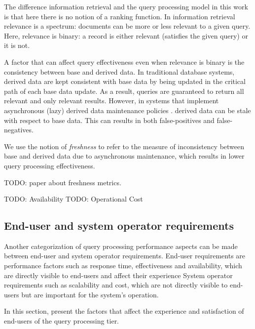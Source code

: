 The difference information retrieval and the query processing model in this work is that here there is no notion of a
ranking function.
In information retrieval relevance is a spectrum: documents can be more or less relevant to a given query.
Here, relevance is binary: a record is either relevant (satisfies the given query) or it is not.


A factor that can affect query effectiveness even when relevance is binary is the consistency between base
and derived data.
In traditional database systems, derived data are kept consistent with base data by being updated in the critical path
of each base data update.
As a result, queries are guaranteed to return all relevant and only relevant results.
However, in systems that implement asynchronous (lazy) derived data maintenance policies \cite{tan:diffindex,
qi:secondaryindexconsistencyanalysis, shukla:schemaagnostic}. derived data can be stale with respect to base data.
This can results in both false-positives and false-negatives.

We use the notion of \textit{freshness} to refer to the measure of inconsistency between base and derived data due to
asynchronous maintenance, which results in lower query processing effectiveness.

TODO: paper about freshness metrics.

TODO: Availability
TODO: Operational Cost


\subsection{End-user and system operator requirements}

Another categorization of query processing performance aspects can be made between end-user and system operator
requirements.
End-user requirements are performance factors such as response time, effectiveness and availability, which are directly
visible to end-users and affect their experience
System operator requirements such as scalability and cost, which are not directly visible to end-users but are important
for the system's operation.


In this section, present the factors that affect the experience and satisfaction of end-users of the query processing
tier.



